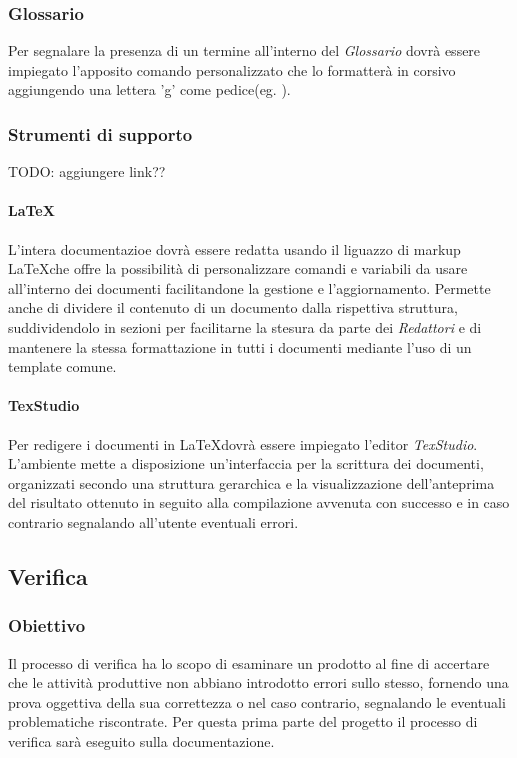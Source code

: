 \subsubsection{Glossario}
Per segnalare la presenza di un termine all'interno del \emph{Glossario} dovrà essere impiegato l'apposito comando personalizzato che lo formatterà in corsivo aggiungendo una lettera 'g' come pedice(eg. ).

\subsubsection{Strumenti di supporto} TODO: aggiungere link??
\paragraph{\LaTeX} \Spazio
L'intera documentazioe dovrà essere redatta usando il liguazzo di markup \LaTeX che offre la possibilità di personalizzare comandi e variabili da usare all'interno dei documenti facilitandone la gestione e l'aggiornamento. Permette anche di dividere il contenuto di un documento dalla rispettiva struttura, suddividendolo in sezioni per facilitarne la stesura da parte dei \emph{Redattori} e di mantenere la stessa formattazione in tutti i documenti mediante l'uso di un template comune.


\paragraph{TexStudio} \Spazio
Per redigere i documenti in \LaTeX dovrà essere impiegato l'editor \emph{TexStudio}. L'ambiente mette a disposizione un'interfaccia per la scrittura dei documenti, organizzati secondo una struttura gerarchica e la visualizzazione dell'anteprima del risultato ottenuto in seguito alla compilazione avvenuta con successo e in caso contrario segnalando all'utente eventuali errori. 


\subsection{Verifica}
\subsubsection{Obiettivo} 
Il processo di verifica ha lo scopo di esaminare un prodotto al fine di accertare che le attività produttive non abbiano introdotto errori sullo stesso, fornendo una prova oggettiva della sua correttezza o nel caso contrario, segnalando le eventuali problematiche riscontrate. Per questa prima parte del progetto il processo di verifica sarà eseguito sulla documentazione.

